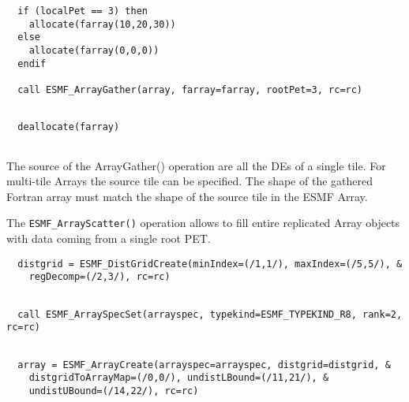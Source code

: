  \begin{verbatim}
  if (localPet == 3) then
    allocate(farray(10,20,30))
  else
    allocate(farray(0,0,0))
  endif
  
  call ESMF_ArrayGather(array, farray=farray, rootPet=3, rc=rc)
 
\end{verbatim}
 

 \begin{verbatim}
  deallocate(farray)
 
\end{verbatim}
 

   The source of the ArrayGather() operation are all the DEs of a single
   tile. For multi-tile Arrays the source tile can be specified. The 
   shape of the gathered Fortran array must match the shape of the source
   tile in the ESMF Array. 

   The {\tt ESMF\_ArrayScatter()} operation allows to fill entire replicated
   Array objects with data coming from a single root PET. 

 \begin{verbatim}
  distgrid = ESMF_DistGridCreate(minIndex=(/1,1/), maxIndex=(/5,5/), &
    regDecomp=(/2,3/), rc=rc)
 
\end{verbatim}
 

 \begin{verbatim}
  call ESMF_ArraySpecSet(arrayspec, typekind=ESMF_TYPEKIND_R8, rank=2, rc=rc)
 
\end{verbatim}
 

 \begin{verbatim}
  array = ESMF_ArrayCreate(arrayspec=arrayspec, distgrid=distgrid, &
    distgridToArrayMap=(/0,0/), undistLBound=(/11,21/), &
    undistUBound=(/14,22/), rc=rc)
 
\end{verbatim}
 

